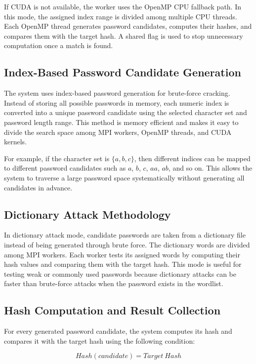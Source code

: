 \documentclass[12pt,a4paper]{article}
\begin{document}
If CUDA is not available, the worker uses the OpenMP CPU fallback path. In this mode, the assigned index range is divided among multiple CPU threads. Each OpenMP thread generates password candidates, computes their hashes, and compares them with the target hash. A shared flag is used to stop unnecessary computation once a match is found.

\subsection{Index-Based Password Candidate Generation}

The system uses index-based password generation for brute-force cracking. Instead of storing all possible passwords in memory, each numeric index is converted into a unique password candidate using the selected character set and password length range. This method is memory efficient and makes it easy to divide the search space among MPI workers, OpenMP threads, and CUDA kernels.

For example, if the character set is $\{a,b,c\}$, then different indices can be mapped to different password candidates such as $a$, $b$, $c$, $aa$, $ab$, and so on. This allows the system to traverse a large password space systematically without generating all candidates in advance.

\subsection{Dictionary Attack Methodology}

In dictionary attack mode, candidate passwords are taken from a dictionary file instead of being generated through brute force. The dictionary words are divided among MPI workers. Each worker tests its assigned words by computing their hash values and comparing them with the target hash. This mode is useful for testing weak or commonly used passwords because dictionary attacks can be faster than brute-force attacks when the password exists in the wordlist.

\subsection{Hash Computation and Result Collection}

For every generated password candidate, the system computes its hash and compares it with the target hash using the following condition:

\[
Hash(candidate) = Target\ Hash
\]
\end{document}
